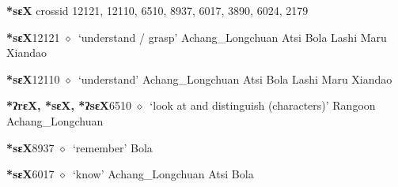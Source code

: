 \item
\textbf{*sɛX}
  {\tiny crossid 12121, 12110, 6510, 8937, 6017, 3890, 6024, 2179}
  \begin{list}{}{\leftmargin=1.5em \itemindent=-1.5em}
  \item {\footnotesize \textbf{*sɛX}}{\tiny 12121}
         $\diamond$~`understand / grasp'
         Achang\_Longchuan 
\hspace{1ex}
         Atsi 
\hspace{1ex}
         Bola 
\hspace{1ex}
         Lashi 
\hspace{1ex}
         Maru 
\hspace{1ex}
         Xiandao 
  \item {\footnotesize \textbf{*sɛX}}{\tiny 12110}
\hspace{1ex}
         $\diamond$~`understand'
         Achang\_Longchuan 
\hspace{1ex}
         Atsi 
\hspace{1ex}
         Bola 
\hspace{1ex}
         Lashi 
\hspace{1ex}
         Maru 
\hspace{1ex}
         Xiandao 
  \item {\footnotesize \textbf{*ʔrɛX, *sɛX, *ʔsɛX}}{\tiny 6510}
\hspace{1ex}
         $\diamond$~`look at and distinguish (characters)'
         Rangoon 
\hspace{1ex}
         Achang\_Longchuan 
  \item {\footnotesize \textbf{*sɛX}}{\tiny 8937}
\hspace{1ex}
         $\diamond$~`remember'
         Bola 
  \item {\footnotesize \textbf{*sɛX}}{\tiny 6017}
\hspace{1ex}
         $\diamond$~`know'
         Achang\_Longchuan 
\hspace{1ex}
         Atsi 
\hspace{1ex}
         Bola 

\end{list}
